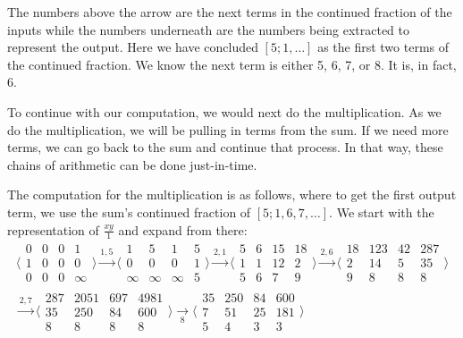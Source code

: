\documentclass[12pt]{article}
\begin{document}
The numbers above the arrow are the next terms in the continued fraction of the inputs while the numbers underneath are the numbers being extracted to represent the output. Here we have concluded $[5; 1, \ldots]$ as the first two terms of the continued fraction. We know the next term is either 5, 6, 7, or 8. It is, in fact, 6. 

To continue with our computation, we would next do the multiplication. As we do the multiplication, we will be pulling in terms from the sum. If we need more terms, we can go back to the sum and continue that process. In that way, these chains of arithmetic can be done just-in-time. 

The computation for the multiplication is as follows, where to get the first output term, we use the sum's continued fraction of $[5; 1, 6, 7, \ldots]$. We start with the representation of $\frac{xy}{1}$ and expand from there: 
\begin{multline*}
 \big\langle\begin{smallmatrix}
  0 & 0 & 0 & 1\\
  1 & 0 & 0 & 0\\
  0 & 0 & 0 & \infty
\end{smallmatrix}\big\rangle
\xrightarrow{1, 5}
\big\langle\begin{smallmatrix}
  1 & 5 & 1 & 5\\
  0 & 0 & 0 & 1\\
  \infty & \infty & \infty & 5 
\end{smallmatrix}\big\rangle   
\xrightarrow{2, 1}
\big\langle\begin{smallmatrix}
  5 & 6 & 15 & 18\\
  1 & 1 & 12 & 2\\
  5 & 6 & 7 & 9 
\end{smallmatrix}\big\rangle  \xrightarrow{2, 6}
\big\langle\begin{smallmatrix}
  18 & 123 & 42 & 287\\
  2 & 14 & 5 & 35  \\
  9 & 8 & 8 & 8 
\end{smallmatrix}\big\rangle  
\\
\xrightarrow{2, 7}
\big\langle\begin{smallmatrix}
  287 & 2051 & 697 & 4981\\
  35 & 250 & 84 & 600  \\
  8 & 8 & 8 & 8 
\end{smallmatrix}\big\rangle 
\xrightarrow[8]{}
\big\langle\begin{smallmatrix}
  35 & 250 & 84 & 600  \\
  7  & 51 & 25 & 181  \\
  5 & 4 & 3 & 3 
\end{smallmatrix}\big\rangle 
\end{multline*}
\end{document}
